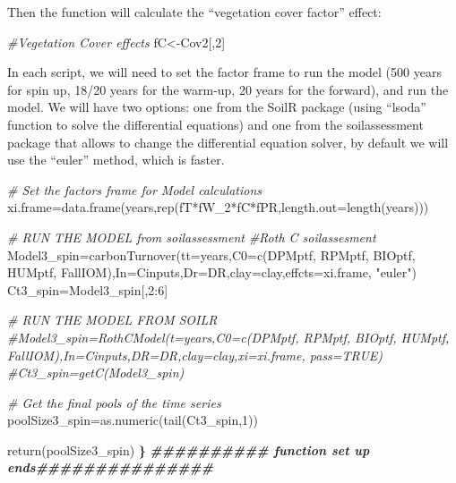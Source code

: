 \documentclass[
  10pt,
  b5paper,
]{book}
\newenvironment{Shaded}{\begin{snugshade}}{\end{snugshade}}
\newcommand{\AttributeTok}[1]{\textcolor[rgb]{0.77,0.63,0.00}{#1}}
\newcommand{\CommentTok}[1]{\textcolor[rgb]{0.56,0.35,0.01}{\textit{#1}}}
\newcommand{\DecValTok}[1]{\textcolor[rgb]{0.00,0.00,0.81}{#1}}
\newcommand{\DocumentationTok}[1]{\textcolor[rgb]{0.56,0.35,0.01}{\textbf{\textit{#1}}}}
\newcommand{\ErrorTok}[1]{\textcolor[rgb]{0.64,0.00,0.00}{\textbf{#1}}}
\newcommand{\FunctionTok}[1]{\textcolor[rgb]{0.00,0.00,0.00}{#1}}
\newcommand{\NormalTok}[1]{#1}
\newcommand{\OtherTok}[1]{\textcolor[rgb]{0.56,0.35,0.01}{#1}}
\newcommand{\SpecialCharTok}[1]{\textcolor[rgb]{0.00,0.00,0.00}{#1}}
\newcommand{\StringTok}[1]{\textcolor[rgb]{0.31,0.60,0.02}{#1}}
\begin{document}
Then the function will calculate the ``vegetation cover factor'' effect:

\begin{Shaded}
\begin{Highlighting}[]
\CommentTok{\#Vegetation Cover effects }
\NormalTok{fC}\OtherTok{\textless{}{-}}\NormalTok{Cov2[,}\DecValTok{2}\NormalTok{]}
\end{Highlighting}
\end{Shaded}

In each script, we will need to set the factor frame to run the model (500 years for spin up, 18/20 years for the warm-up, 20 years for the forward), and run the model. We will have two options: one from the SoilR package (using ``lsoda'' function to solve the differential equations) and one from the soilassessment package that allows to change the differential equation solver, by default we will use the ``euler'' method, which is faster.

\begin{Shaded}
\begin{Highlighting}[]
\CommentTok{\# Set the factors frame for Model calculations}
\NormalTok{xi.frame}\OtherTok{=}\FunctionTok{data.frame}\NormalTok{(years,}\FunctionTok{rep}\NormalTok{(fT}\SpecialCharTok{*}\NormalTok{fW\_2}\SpecialCharTok{*}\NormalTok{fC}\SpecialCharTok{*}\NormalTok{fPR,}\AttributeTok{length.out=}\FunctionTok{length}\NormalTok{(years)))}


\CommentTok{\# RUN THE MODEL from soilassessment}
\CommentTok{\#Roth C soilassesment}
\NormalTok{Model3\_spin}\OtherTok{=}\FunctionTok{carbonTurnover}\NormalTok{(}\AttributeTok{tt=}\NormalTok{years,}\AttributeTok{C0=}\FunctionTok{c}\NormalTok{(DPMptf, RPMptf, BIOptf, HUMptf, FallIOM),}\AttributeTok{In=}\NormalTok{Cinputs,}\AttributeTok{Dr=}\NormalTok{DR,}\AttributeTok{clay=}\NormalTok{clay,}\AttributeTok{effcts=}\NormalTok{xi.frame, }\StringTok{"euler"}\NormalTok{) }
\NormalTok{Ct3\_spin}\OtherTok{=}\NormalTok{Model3\_spin[,}\DecValTok{2}\SpecialCharTok{:}\DecValTok{6}\NormalTok{]}

\CommentTok{\# RUN THE MODEL FROM SOILR}
\CommentTok{\#Model3\_spin=RothCModel(t=years,C0=c(DPMptf, RPMptf, BIOptf, HUMptf, FallIOM),In=Cinputs,DR=DR,clay=clay,xi=xi.frame, pass=TRUE) }
\CommentTok{\#Ct3\_spin=getC(Model3\_spin)}

\CommentTok{\# Get the final pools of the time series}
\NormalTok{poolSize3\_spin}\OtherTok{=}\FunctionTok{as.numeric}\NormalTok{(}\FunctionTok{tail}\NormalTok{(Ct3\_spin,}\DecValTok{1}\NormalTok{))}

\FunctionTok{return}\NormalTok{(poolSize3\_spin)}
\ErrorTok{\}}
\DocumentationTok{\#\#\#\#\#\#\#\#\#\# function set up ends\#\#\#\#\#\#\#\#\#\#\#\#\#\#\#}
\end{Highlighting}
\end{Shaded}
\end{document}
